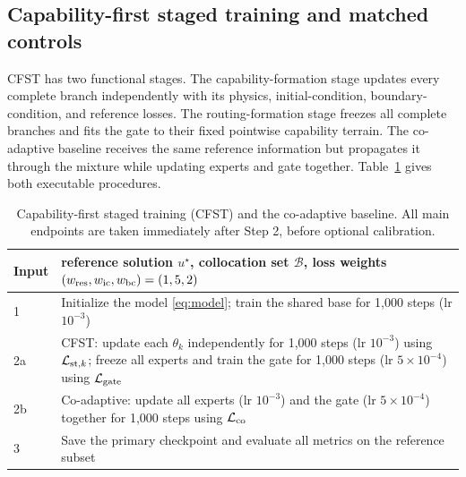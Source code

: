 \documentclass[preprint,12pt]{elsarticle}
\theoremstyle{remark}
\begin{document}
\subsection{Capability-first staged training and matched controls}
\label{sec:cfst}
CFST has two functional stages. The capability-formation stage updates every complete branch independently with its physics, initial-condition, boundary-condition, and reference losses. The routing-formation stage freezes all complete branches and fits the gate to their fixed pointwise capability terrain. The co-adaptive baseline receives the same reference information but propagates it through the mixture while updating experts and gate together. Table~\ref{alg:protocol} gives both executable procedures.

\begin{table}[H]
\centering\small
\caption{Capability-first staged training (CFST) and the co-adaptive baseline. All main endpoints are taken immediately after Step 2, before optional calibration.}
\label{alg:protocol}
\begin{tabularx}{\linewidth}{@{}lX@{}}
\toprule
Input & reference solution $u^\star$, collocation set $\mathcal B$, loss weights $(w_{\rm res},w_{\rm ic},w_{\rm bc})=(1,5,2)$\\
\midrule
1 & Initialize the model \eqref{eq:model}; train the shared base for 1,000 steps (lr $10^{-3}$)\\
2a & CFST: update each $\theta_k$ independently for 1,000 steps (lr $10^{-3}$) using $\mathcal L_{{\rm st},k}$; freeze all experts and train the gate for 1,000 steps (lr $5\times10^{-4}$) using $\mathcal L_{\rm gate}$\\
2b & Co-adaptive: update all experts (lr $10^{-3}$) and the gate (lr $5\times10^{-4}$) together for 1,000 steps using $\mathcal L_{\rm co}$\\
3 & Save the primary checkpoint and evaluate all metrics on the reference subset\\
\bottomrule
\end{tabularx}
\end{table}
\end{document}
